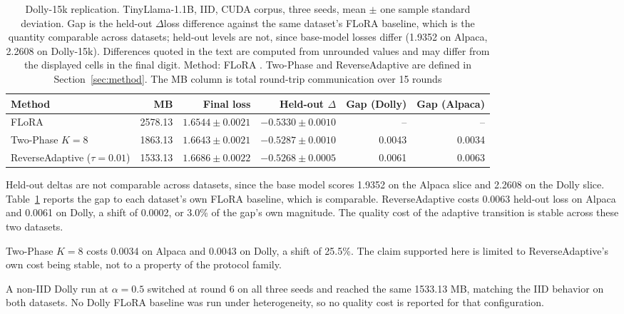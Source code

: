 \documentclass[iicol,pdflatex,sn-mathphys-num]{sn-jnl}
\begin{document}
\begin{table}[tbp]
\centering
\footnotesize
\setlength{\tabcolsep}{6pt}
\caption{Dolly-15k replication. TinyLlama-1.1B, IID, CUDA corpus, three seeds, mean $\pm$ one sample standard deviation. Gap is the held-out $\Delta$loss difference against the same dataset's FLoRA baseline, which is the quantity comparable across datasets; held-out levels are not, since base-model losses differ (1.9352 on Alpaca, 2.2608 on Dolly-15k). Differences quoted in the text are computed from unrounded values and may differ from the displayed cells in the final digit. Method: FLoRA \cite{wang2024flora}. Two-Phase and ReverseAdaptive are defined in Section~\ref{sec:method}. The MB column is total round-trip communication over 15 rounds}
\label{tab:dolly}
\begin{tabular}{@{}lrrrrr@{}}
\toprule
Method & MB & Final loss & Held-out $\Delta$ & Gap (Dolly) & Gap (Alpaca) \\
\midrule
FLoRA                           & 2578.13 & $1.6544 \pm 0.0021$ & $-0.5330 \pm 0.0010$ & -- & -- \\
Two-Phase $K{=}8$               & 1863.13 & $1.6643 \pm 0.0021$ & $-0.5287 \pm 0.0010$ & 0.0043 & 0.0034 \\
ReverseAdaptive ($\tau{=}0.01$) & 1533.13 & $1.6686 \pm 0.0022$ & $-0.5268 \pm 0.0005$ & 0.0061 & 0.0063 \\
\bottomrule
\end{tabular}
\end{table}

Held-out deltas are not comparable across datasets, since the base model scores 1.9352 on the Alpaca slice and 2.2608 on the Dolly slice. Table~\ref{tab:dolly} reports the gap to each dataset's own FLoRA baseline, which is comparable. ReverseAdaptive costs 0.0063 held-out loss on Alpaca and 0.0061 on Dolly, a shift of 0.0002, or 3.0\% of the gap's own magnitude. The quality cost of the adaptive transition is stable across these two datasets.

Two-Phase $K{=}8$ costs 0.0034 on Alpaca and 0.0043 on Dolly, a shift of 25.5\%. The claim supported here is limited to ReverseAdaptive's own cost being stable, not to a property of the protocol family.

A non-IID Dolly run at $\alpha{=}0.5$ switched at round 6 on all three seeds and reached the same 1533.13 MB, matching the IID behavior on both datasets. No Dolly FLoRA baseline was run under heterogeneity, so no quality cost is reported for that configuration.
\end{document}
